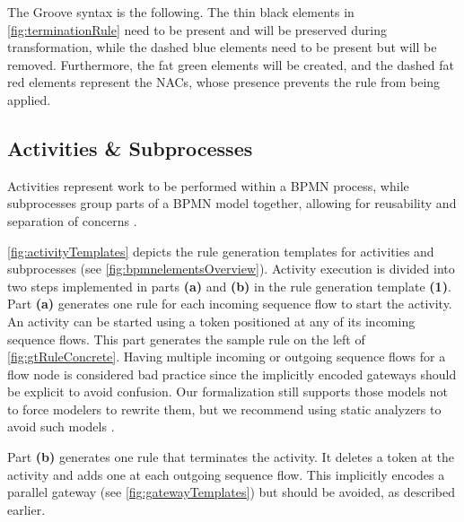 \documentclass{lmcs} %
\begin{document}
The Groove syntax is the following.
The thin black elements in \autoref{fig:terminationRule} need to be present and will be preserved during transformation, while the dashed blue elements need to be present but will be removed.
Furthermore, the fat green elements will be created, and the dashed fat red elements represent the NACs, whose presence prevents the rule from being applied.

\subsection{Activities \& Subprocesses}
Activities represent work to be performed within a BPMN process, while subprocesses group parts of a BPMN model together, allowing for reusability and separation of concerns \cite{objectmanagementgroupBusinessProcessModel2013}.

\autoref{fig:activityTemplates} depicts the rule generation templates for activities and subprocesses (see \autoref{fig:bpmnelementsOverview}).
Activity execution is divided into two steps implemented in parts \textbf{(a)} and \textbf{(b)} in the rule generation template \textbf{(1)}.
Part \textbf{(a)} generates one rule for each incoming sequence flow to start the activity.
An activity can be started using a token positioned at any of its incoming sequence flows.
This part generates the sample rule on the left of \autoref{fig:gtRuleConcrete}.
Having multiple incoming or outgoing sequence flows for a flow node is considered bad practice since the implicitly encoded gateways should be explicit to avoid confusion.
Our formalization still supports those models not to force modelers to rewrite them, but we recommend using static analyzers to avoid such models \cite{camundaservicesgmbhBpmnlint2023}.

Part \textbf{(b)} generates one rule that terminates the activity.
It deletes a token at the activity and adds one at each outgoing sequence flow.
This implicitly encodes a parallel gateway (see \autoref{fig:gatewayTemplates}) but should be avoided, as described earlier. 
\end{document}
